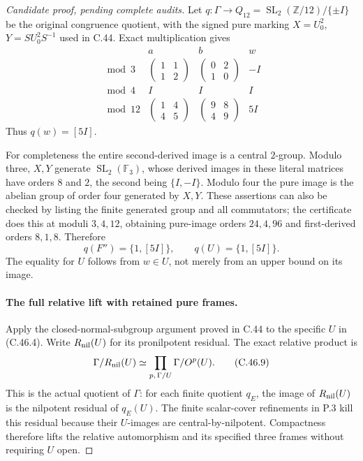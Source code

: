 \begin{proof}[Candidate proof, pending complete audits]
Let $q:\Gamma\to Q_{12}=\operatorname{SL}_2(\mathbb Z/12)/\{\pm I\}$
be the original congruence quotient, with the signed pure marking
$X=U_0^2$, $Y=SU_0^2S^{-1}$ used in C.44. Exact multiplication gives
\[
\begin{array}{c|c|c|c}
 &a&b&w\\ \hline
 \bmod 3&\begin{pmatrix}1&1\\1&2\end{pmatrix}
 &\begin{pmatrix}0&2\\1&0\end{pmatrix}&-I\\[3pt]
 \bmod 4&I&I&I\\[3pt]
 \bmod 12&\begin{pmatrix}1&4\\4&5\end{pmatrix}
 &\begin{pmatrix}9&8\\4&9\end{pmatrix}&5I
\end{array}                                                   \tag{C.46.7}
\]
Thus $q(w)=[5I]$.

For completeness the entire second-derived image is a central
$2$-group. Modulo three, $X,Y$ generate
$\operatorname{SL}_2(\mathbb F_3)$, whose derived images in these
literal matrices have orders $8$ and $2$, the second being
$\{I,-I\}$. Modulo four the pure image is the abelian group of
order four generated by $X,Y$. These assertions can also be checked
by listing the finite generated group and all commutators; the
certificate does this at moduli $3,4,12$, obtaining pure-image orders
$24,4,96$ and first-derived orders $8,1,8$. Therefore
\[
       q(F'')=\{1,[5I]\},\qquad q(U)=\{1,[5I]\}.     \tag{C.46.8}
\]
The equality for $U$ follows from $w\in U$, not merely from an
upper bound on its image.

\paragraph{The full relative lift with retained pure frames.}
Apply the closed-normal-subgroup argument proved in C.44 to the
specific $U$ in (C.46.4). Write $R_{\rm nil}(U)$ for its
pronilpotent residual. The exact relative product is
\[
 \Gamma/R_{\rm nil}(U)
  \simeq\prod_{p,\,\Gamma/U}\Gamma/O^p(U).            \tag{C.46.9}
\]
This is the actual quotient of $\Gamma$: for each finite quotient
$q_E$, the image of $R_{\rm nil}(U)$ is the nilpotent residual
of $q_E(U)$. The finite scalar-cover refinements in P.3 kill this
residual because their $U$-images are central-by-nilpotent. Compactness
therefore lifts the relative automorphism and its specified three
frames without requiring $U$ open.


\end{proof}
